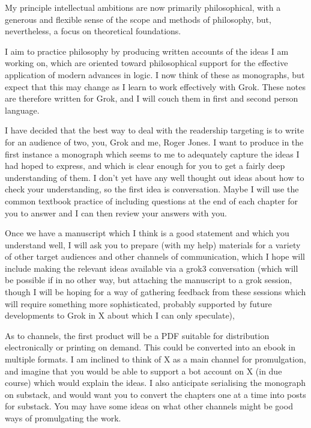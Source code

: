 My principle intellectual ambitions are now primarily philosophical, with a generous and flexible sense of the scope and methods of philosophy, but, nevertheless, a focus on theoretical foundations.

I aim to practice philosophy by producing written accounts of the ideas I am working on, which are oriented toward philosophical support for the effective application of modern advances in logic.
I now think of these as monographs, but expect that this may change as I learn to work effectively with Grok.
These notes are therefore written for Grok, and I will couch them in first and second person language.

I have decided that the best way to deal with the readership targeting is to write for an audience of two, you, Grok and me, Roger Jones.
I want to produce in the first instance a monograph which seems to me to adequately capture the ideas I had hoped to express, and which is clear enough for you to get a fairly deep understanding of them.
I don't yet have any well thought out ideas about how to check your understanding, so the first idea is conversation.
Maybe I will use the common textbook practice of including questions at the end of each chapter for you to answer and I can then review your answers with you.

Once we have a manuscript which I think is a good statement and which you understand well, I will ask you to prepare (with my help) materials for a variety of other target audiences and other channels of communication, which I hope will include making the relevant ideas available via a grok3 conversation (which will be possible if in no other way, but attaching the manuscript to a grok session, though I will be hoping for a way of gathering feedback from these sessions which will require something more sophisticated, probably supported by future developments to Grok in X about which I can only speculate),

As to channels, the first product will be a PDF suitable for distribution electronically or printing on demand.
This could be converted into an ebook in multiple formats.
I am inclined to think of X as a main channel for promulgation, and imagine that you would be able to support a bot account on X (in due course) which would explain the ideas.
I also anticipate serialising the monograph on substack, and would want you to convert the chapters one at a time into posts for substack.
You may have some ideas on what other channels might be good ways of promulgating the work.

